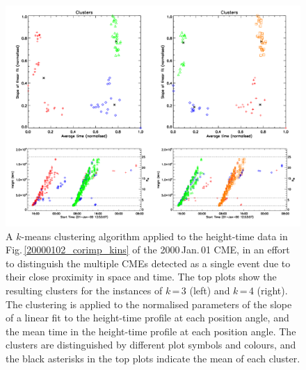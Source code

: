 \documentclass[referee,a4paper,12pt,traditabstract]{swsc}
\begin{document}
\begin{linenumbers}
\begin{figure}[ht]
\centerline{\includegraphics[width=\linewidth]{images/20000101_cluster_kins.pdf}}
\caption{A $k$-means clustering algorithm applied to the height-time data in Fig.\,\ref{20000102_corimp_kins} of the 2000\,Jan.\,01 CME, in an effort to distinguish the multiple CMEs detected as a single event due to their close proximity in space and time. The top plots show the resulting clusters for the instances of $k$\,=\,3 (left) and $k$\,=\,4 (right). The clustering is applied to the normalised parameters of the slope of a linear fit to the height-time profile at each position angle, and the mean time in the height-time profile at each position angle. The clusters are distinguished by different plot symbols and colours, and the black asterisks in the top plots indicate the mean of each cluster.}
\label{20000101_cluster_kins}
\end{figure}


\end{linenumbers}
\end{document}
